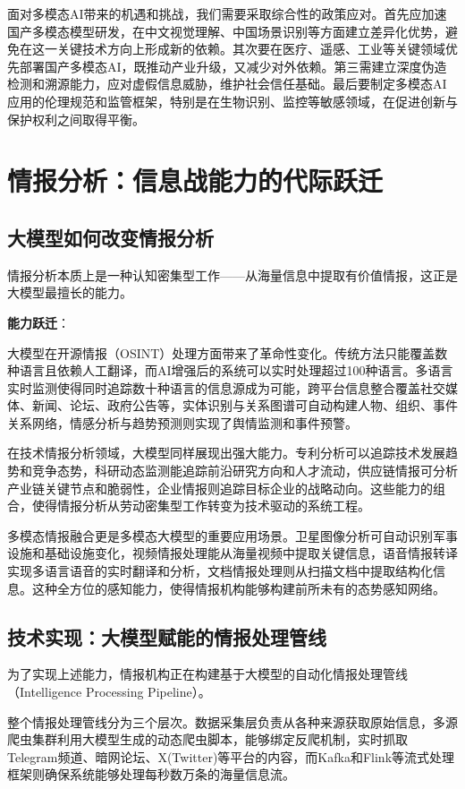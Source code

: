 面对多模态AI带来的机遇和挑战，我们需要采取综合性的政策应对。首先应加速国产多模态模型研发，在中文视觉理解、中国场景识别等方面建立差异化优势，避免在这一关键技术方向上形成新的依赖。其次要在医疗、遥感、工业等关键领域优先部署国产多模态AI，既推动产业升级，又减少对外依赖。第三需建立深度伪造检测和溯源能力，应对虚假信息威胁，维护社会信任基础。最后要制定多模态AI应用的伦理规范和监管框架，特别是在生物识别、监控等敏感领域，在促进创新与保护权利之间取得平衡。

\section{情报分析：信息战能力的代际跃迁}

\subsection{大模型如何改变情报分析}

情报分析本质上是一种认知密集型工作——从海量信息中提取有价值情报，这正是大模型最擅长的能力。

\textbf{能力跃迁}：

大模型在开源情报（OSINT）处理方面带来了革命性变化。传统方法只能覆盖数种语言且依赖人工翻译，而AI增强后的系统可以实时处理超过100种语言。多语言实时监测使得同时追踪数十种语言的信息源成为可能，跨平台信息整合覆盖社交媒体、新闻、论坛、政府公告等，实体识别与关系图谱可自动构建人物、组织、事件关系网络，情感分析与趋势预测则实现了舆情监测和事件预警。

在技术情报分析领域，大模型同样展现出强大能力。专利分析可以追踪技术发展趋势和竞争态势，科研动态监测能追踪前沿研究方向和人才流动，供应链情报可分析产业链关键节点和脆弱性，企业情报则追踪目标企业的战略动向。这些能力的组合，使得情报分析从劳动密集型工作转变为技术驱动的系统工程。

多模态情报融合更是多模态大模型的重要应用场景。卫星图像分析可自动识别军事设施和基础设施变化，视频情报处理能从海量视频中提取关键信息，语音情报转译实现多语言语音的实时翻译和分析，文档情报处理则从扫描文档中提取结构化信息。这种全方位的感知能力，使得情报机构能够构建前所未有的态势感知网络。

\subsection{技术实现：大模型赋能的情报处理管线}

为了实现上述能力，情报机构正在构建基于大模型的自动化情报处理管线（Intelligence Processing Pipeline）。

整个情报处理管线分为三个层次。数据采集层负责从各种来源获取原始信息，多源爬虫集群利用大模型生成的动态爬虫脚本，能够绑定反爬机制，实时抓取Telegram频道、暗网论坛、X(Twitter)等平台的内容，而Kafka和Flink等流式处理框架则确保系统能够处理每秒数万条的海量信息流。

